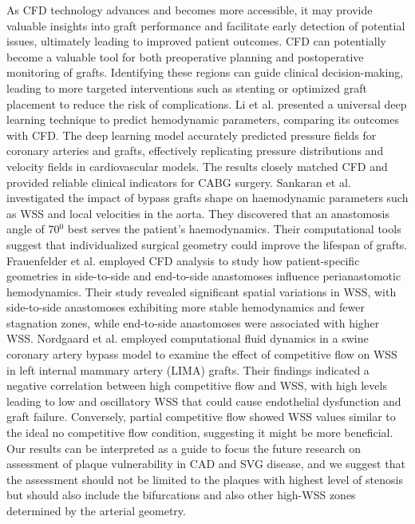 ﻿\documentclass[12pt,a4paper]{article}
\theoremstyle{definition}
\numberwithin{equation}{section}
\begin{document}
As CFD technology advances and becomes more accessible, it may provide valuable insights into graft performance and facilitate early detection of potential issues, ultimately leading to improved patient outcomes. CFD can potentially become  a valuable tool for both preoperative planning and postoperative monitoring of grafts. Identifying these regions can guide clinical decision-making, leading to more targeted interventions such as stenting or optimized graft placement to reduce the risk of complications. Li et al. \cite{1} presented a universal deep learning technique to predict hemodynamic parameters, comparing its outcomes with CFD. The deep learning model accurately predicted pressure fields for coronary arteries and grafts, effectively replicating pressure distributions and velocity fields in cardiovascular models. The results closely matched CFD and provided reliable clinical indicators for CABG surgery. Sankaran et al. \cite{2} investigated the impact of bypass grafts shape on haemodynamic parameters such as WSS and local velocities in the aorta. They discovered that an anastomosis angle of 70$^0$ best serves the patient's haemodynamics. Their computational tools suggest that individualized surgical geometry could improve the lifespan of grafts. Frauenfelder et al. \cite{5} employed CFD analysis to study how patient-specific geometries in side-to-side and end-to-side anastomoses influence perianastomotic hemodynamics. Their study revealed significant spatial variations in WSS, with side-to-side anastomoses exhibiting more stable hemodynamics and fewer stagnation zones, while end-to-side anastomoses were associated with higher WSS. Nordgaard et al. \cite{6} employed computational fluid dynamics in a swine coronary artery bypass model to examine the effect of competitive flow on WSS in left internal mammary artery (LIMA) grafts. Their findings indicated a negative correlation between high competitive flow and WSS, with high levels leading to low and oscillatory WSS that could cause endothelial dysfunction and graft failure. Conversely, partial competitive flow showed WSS values similar to the ideal no competitive flow condition, suggesting it might be more beneficial. Our results can be interpreted as a guide to focus the future research on assessment of plaque vulnerability in CAD and SVG disease, and we suggest that the assessment should not be limited to the plaques with highest level of stenosis but should also include the bifurcations and also other high-WSS zones determined by the arterial geometry.
\end{document}
